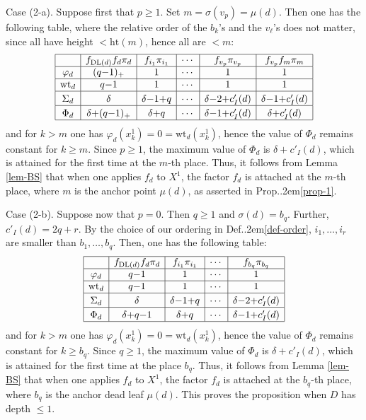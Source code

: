 \documentclass[12pt]{amsart}
\numberwithin{equation}{section}
\theoremstyle{definition}
\def\Def{Def.\kern.2em}
\def\Prop{Prop.\kern.2em}
\def\DL{\mathrm{DL}}  %
\def\haut{\mathrm{ht}} %
\def\wt{\mathrm{wt}}  %
\begin{document}
\smallskip Case (2-a). Suppose first that $p\geq 1$. Set $m = \sigma(v_p) = \mu(d)$. 
Then one has the following table, where the relative order of the $b_k$'s and the $v_\ell$'s does not matter, 
since all have height $< \haut(m)$, hence all are $< m$: 
$$
\begin{array}{|c|c|c|c|c|c|} 
\hline 
 &  f_{\DL(d)} f_d \pi_d & f_{i_1} \pi_{i_1} &  \cdots &  f_{v_p} \pi_{v_p} & f_{v_p} f_m \pi_m
\\
\hline 
\varphi_d & (q{-}1)_+ & 1 & \cdots & 1 & 1  
\\
\hline 
\wt_d & q{-}1 & 1 & \cdots & 1 & 1 
\\
\hline 
\Sigma_d & \delta & \delta {-1 +} q   & \cdots & \delta {-2 +} c'_I(d) & \delta {-1 +} c'_I(d) \rule{0pt}{10.5pt}
\\
\hline 
\Phi_d & \delta{+} (q{-}1)_+ & \delta {+} q   & \cdots &  \delta {-1 +} c'_I(d) & \delta {+} c'_I(d) \rule{0pt}{10.5pt}
\\
\hline
\end{array}
$$
and for $k > m$ one has $\varphi_d(x_k^1) = 0 = \wt_d(x_k^1)$, hence 
 the value of $\Phi_d$ remains constant for $k \geq m$. 
 Since $p\geq 1$, the maximum value of $\Phi_d$ is 
 $\delta{+}c'_I(d)$, which is attained for the first time at the $m$-th place. Thus,  
it follows from Lemma \ref{lem-BS} that when one applies 
$f_d$ to $X^1$, the factor $f_d$ is attached at the $m$-th place, where 
$m$ is the anchor point $\mu(d)$, as asserted in \Prop \ref{prop-1}.  

\smallskip Case (2-b). Suppose now that $p = 0$. Then $q \geq 1$ and $\sigma(d) = b_q$. 
Further, $c'_I(d) = 2q + r$. 
By the choice of our ordering in \Def \ref{def-order}, 
$i_1,\dots, i_r$ are smaller than $b_1,\dots, b_q$. Then, one has the following table: 
$$
\begin{array}{|c|c|c|c|c|} 
\hline 
 &  f_{\DL(d)} f_d \pi_d & f_{i_1} \pi_{i_1} &  \cdots &  f_{b_q} \pi_{b_q} 
\\
\hline 
\varphi_d & q{-}1 & 1 & \cdots & 1   
\\
\hline 
\wt_d & q{-}1 & 1 & \cdots & 1  
\\
\hline 
\Sigma_d & \delta & \delta {-1 +} q   & \cdots & \delta {-2 +} c'_I(d)   \rule{0pt}{10.5pt}
\\
\hline 
\Phi_d & \delta{+} q{-}1 & \delta {+} q   & \cdots &  \delta {-1 +} c'_I(d)  \rule{0pt}{10.5pt}
\\
\hline
\end{array}
$$
and for $k > m$ one has $\varphi_d(x_k^1) = 0 = \wt_d(x_k^1)$, hence 
 the value of $\Phi_d$ remains constant for $k \geq b_q$. Since $q\geq 1$, the maximum value of $\Phi_d$ is 
 $\delta{+}c'_I(d)$, which is attained for the first time at the place $b_q$. Thus,  
it follows from Lemma \ref{lem-BS} that when one applies 
$f_d$ to $X^1$, the factor $f_d$ is attached at the $b_q$-th place, where 
$b_q$ is the anchor dead leaf $\mu(d)$. 
This proves the proposition when $D$ has depth $\leq 1$. 
\end{document}
